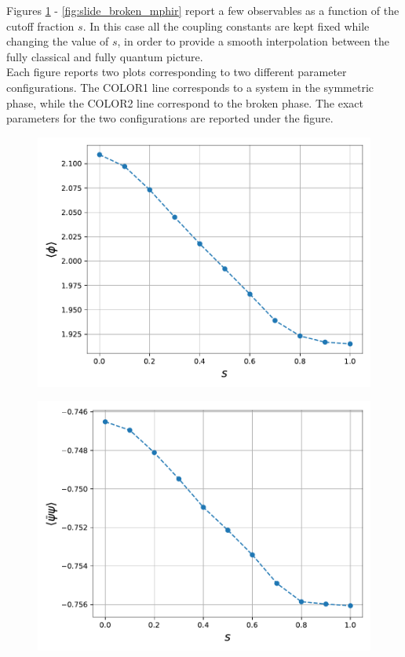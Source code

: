 Figures \ref{fig:slide_broken_phi} - \ref{fig:slide_broken_mphir} report a few observables as a function of the cutoff fraction $s$. In this case all the coupling constants are kept fixed while changing the value of $s$, in order to provide a smooth interpolation between the fully classical and fully quantum picture. \\
Each figure reports two plots corresponding to two different parameter configurations. The COLOR1 line corresponds to a system in the symmetric phase, while the COLOR2 line correspond to the broken phase. The exact parameters for the two configurations are reported under the figure.
\begin{figure}
    \centering
    \begin{minipage}{0.45\textwidth}
        \includegraphics[scale=0.52]{figures/slide_broken/phi.pdf}
        \label{fig:slide_broken_phi}
    \end{minipage}
    \hfill
    \begin{minipage}{0.45\textwidth}
        \includegraphics[scale=0.52]{figures/slide_broken/cond.pdf}

\end{minipage}
\end{figure}
